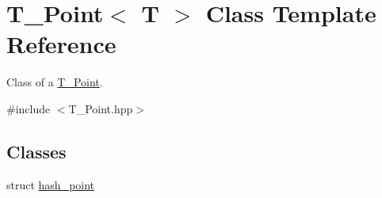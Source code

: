 \hypertarget{classPoint}{}\section{T_Point$<$ T $>$ Class Template Reference}
\label{classPoint}


Class of a \hyperlink{classPoint}{T_Point}.




{\ttfamily \#include $<$T_Point.\+hpp$>$}

\subsection*{Classes}
\begin{DoxyCompactItemize}
\item 
struct \hyperlink{structPoint_1_1hash__point}{hash\+\_\+point}
\end{DoxyCompactItemize}
